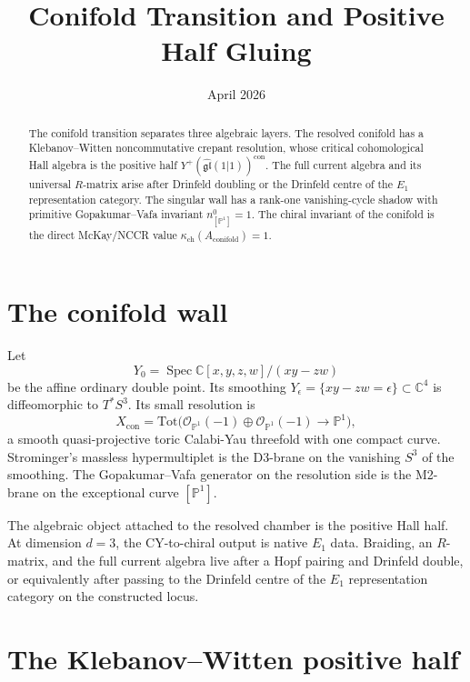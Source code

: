 \documentclass[11pt]{amsart}
\title{Conifold Transition and Positive Half Gluing}
\date{April 2026}
\providecommand{\C}{\mathbb{C}}
\providecommand{\bP}{\mathbb{P}}
\providecommand{\cO}{\mathcal{O}}
\providecommand{\fgl}{\mathfrak{gl}}
\providecommand{\Tot}{\mathrm{Tot}}
\providecommand{\kch}{\kappa_{\mathrm{ch}}}
\theoremstyle{plain}
\theoremstyle{definition}
\theoremstyle{remark}
\begin{document}
\maketitle

\begin{abstract}
The conifold transition separates three algebraic layers.  The resolved
conifold has a Klebanov--Witten noncommutative crepant resolution, whose
critical cohomological Hall algebra is the positive half
$Y^+(\widehat{\fgl}(1|1))^{\mathrm{con}}$.  The full current algebra and
its universal $R$-matrix arise after Drinfeld doubling or the
Drinfeld centre of the $E_1$ representation category.  The singular wall
has a rank-one vanishing-cycle shadow with primitive
Gopakumar--Vafa invariant $n^0_{[\bP^1]}=1$.  The chiral invariant of the
conifold is the direct McKay/NCCR value
$\kch(A_{\mathrm{conifold}})=1$.
\end{abstract}

\section{The conifold wall}

Let
\[
  Y_0=\operatorname{Spec}\C[x,y,z,w]/(xy-zw)
\]
be the affine ordinary double point.  Its smoothing
$Y_\epsilon=\{xy-zw=\epsilon\}\subset\C^4$ is diffeomorphic to
$T^*S^3$.  Its small resolution is
\[
  X_{\mathrm{con}}
  =
  \Tot\bigl(\cO_{\bP^1}(-1)\oplus\cO_{\bP^1}(-1)\to\bP^1\bigr),
\]
a smooth quasi-projective toric Calabi-Yau threefold with one compact
curve.  Strominger's massless hypermultiplet is the D3-brane on the
vanishing $S^3$ of the smoothing.  The Gopakumar--Vafa generator on the
resolution side is the M2-brane on the exceptional curve
$[\bP^1]$.

The algebraic object attached to the resolved chamber is the positive
Hall half.  At dimension $d=3$, the CY-to-chiral output is native
$E_1$ data.  Braiding, an $R$-matrix, and the full current algebra live
after a Hopf pairing and Drinfeld double, or equivalently after passing
to the Drinfeld centre of the $E_1$ representation category on the
constructed locus.

\section{The Klebanov--Witten positive half}
\end{document}
